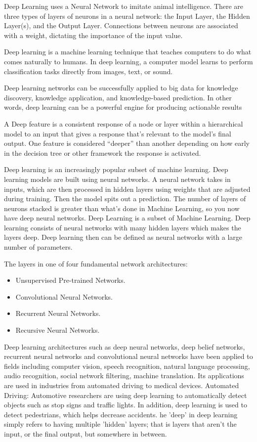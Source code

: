Deep Learning uses a Neural Network to imitate animal intelligence. There are three types of layers of neurons in a neural network: the Input Layer, the Hidden Layer(s), and the Output Layer. Connections between neurons are associated with a weight, dictating the importance of the input value.

Deep learning is a machine learning technique that teaches computers to do what comes naturally to humans. In deep learning, a computer model learns to perform classification tasks directly from images, text, or sound.

Deep learning networks can be successfully applied to big data for knowledge discovery, knowledge application, and knowledge-based prediction. In other words, deep learning can be a powerful engine for producing actionable results

A Deep feature is a consistent response of a node or layer within a hierarchical model to an input that gives a response that's relevant to the model's final output. One feature is considered “deeper” than another depending on how early in the decision tree or other framework the response is activated.

Deep learning is an increasingly popular subset of machine learning. Deep learning models are built using neural networks. A neural network takes in inputs, which are then processed in hidden layers using weights that are adjusted during training. Then the model spits out a prediction. The number of layers of neurons stacked is greater than what's done in Machine Learning, so you now have deep neural networks. Deep Learning is a subset of Machine Learning. Deep learning consists of neural networks with many hidden layers which makes the layers deep. Deep learning then can be defined as neural networks with a large number of parameters.

The layers in one of four fundamental network architectures\cite{15}:
\begin{itemize}

\item Unsupervised Pre-trained Networks.
\item Convolutional Neural Networks.
\item Recurrent Neural Networks.
\item Recursive Neural Networks.
\end{itemize}
Deep learning architectures such as deep neural networks, deep belief networks, recurrent neural networks and convolutional neural networks have been applied to fields including computer vision, speech recognition, natural language processing, audio recognition, social network filtering, machine translation. Its applications are used in industries from automated driving to medical devices. Automated Driving: Automotive researchers are using deep learning to automatically detect objects such as stop signs and traffic lights. In addition, deep learning is used to detect pedestrians, which helps decrease accidents. he 'deep' in deep learning simply refers to having multiple 'hidden' layers; that is layers that aren't the input, or the final output, but somewhere in between.

